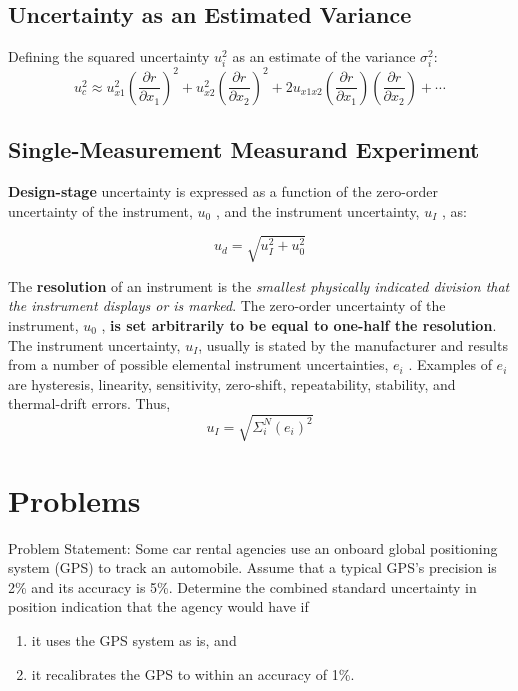 \documentclass[a4paper,11pt,dvipsnames]{book}
\begin{document}
\section*{Uncertainty as an Estimated Variance}

Defining the squared uncertainty $u_i^2$ as
an estimate of the variance $\sigma_i^2$: 
\begin{equation}
u_c^2 \approx u_{x1}^2\left(\frac{\partial r}{\partial x_1}\right)^2 +  u_{x2}^2\left(\frac{\partial r}{\partial x_2}\right)^2 + 2u_{x1x2}\left(\frac{\partial r}{\partial x_1}\right)\left(\frac{\partial r}{\partial x_2}\right) + \cdots
\end{equation}

\section*{Single-Measurement Measurand Experiment}

\textbf{Design-stage} uncertainty is expressed as a function of the zero-order uncertainty of the instrument, $u_0$ , 
and the instrument uncertainty, $u_I$ , as:

\begin{equation}
u_d = \sqrt{u_I^2 + u_0^2}
\end{equation}

The \textbf{resolution} of an instrument is the \emph{smallest physically indicated division that the instrument displays or is marked}. The zero-order uncertainty of the instrument, $u_0$ , \textbf{is set arbitrarily to be equal to one-half the resolution}. \\

The instrument uncertainty, $u_I$, usually is stated by the manufacturer and
results from a number of possible elemental instrument uncertainties, $e_i$ .
Examples of $e_i$ are hysteresis, linearity, sensitivity, zero-shift, repeatability,
stability, and thermal-drift errors. Thus,
\begin{equation}
u_I=\sqrt{\Sigma_i^N (e_i)^2}
\end{equation}


\chapter*{Problems}


\begin{question}
Problem Statement: Some car rental agencies use an onboard global positioning
system (GPS) to track an automobile. Assume that a typical GPS’s precision is 2\%
and its accuracy is 5\%. Determine the combined standard uncertainty in position indication that the agency would have if \begin{enumerate}
\item  it uses the GPS system as is, and 
\item it recalibrates the GPS to within an accuracy of 1\%.
\end{enumerate}

\end{question}
\begin{solution}
\examspace*{10em}


\end{solution}
\end{document}
